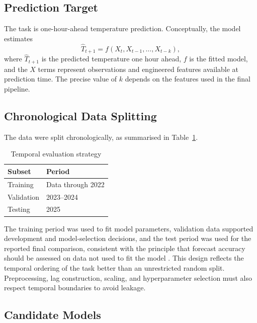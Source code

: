 \documentclass[12pt,a4paper]{article}
\begin{document}
	\subsection{Prediction Target}
	
	The task is one-hour-ahead temperature prediction. Conceptually,
	the model estimates
	\begin{equation}
		\widehat{T}_{t+1}=f(X_t,X_{t-1},\ldots,X_{t-k}),
	\end{equation}
	where $\widehat{T}_{t+1}$ is the predicted temperature one hour
	ahead, $f$ is the fitted model, and the $X$ terms represent
	observations and engineered features available at prediction time.
	The precise value of $k$ depends on the features used in the final
	pipeline.
	
	\subsection{Chronological Data Splitting}
	
	The data were split chronologically, as summarised in
	Table~\ref{tab:temporal-split}.
	
	\begin{table}[H]
		\centering
		\caption{Temporal evaluation strategy}
		\label{tab:temporal-split}
		\begin{tabular}{ll}
			\toprule
			\textbf{Subset} & \textbf{Period}\\
			\midrule
			Training & Data through 2022\\
			Validation & 2023--2024\\
			Testing & 2025\\
			\bottomrule
		\end{tabular}
	\end{table}
	
	The training period was used to fit model parameters, validation
	data supported development and model-selection decisions, and the
	test period was used for the reported final comparison, consistent
	with the principle that forecast accuracy should be assessed on data
	not used to fit the model \cite{hyndman2021,bergmeir2018}. This design
	reflects the temporal ordering of the task better than an
	unrestricted random split. Preprocessing, lag construction, scaling,
	and hyperparameter selection must also respect temporal boundaries
	to avoid leakage.
	
	\subsection{Candidate Models}
	
\end{document}
